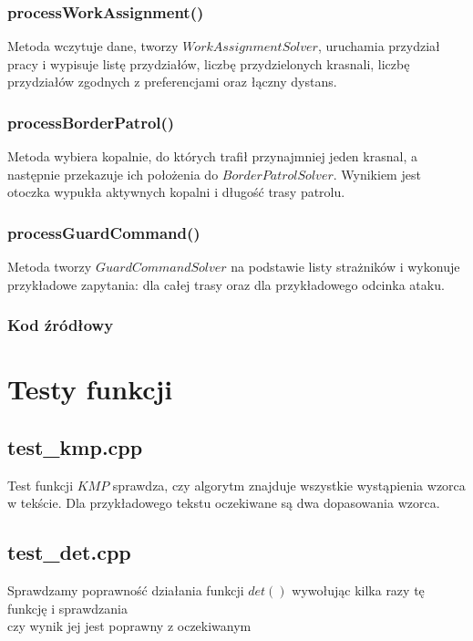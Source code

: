 \documentclass{article}
\begin{document}
\subsubsection{processWorkAssignment()}
Metoda wczytuje dane, tworzy $WorkAssignmentSolver$, uruchamia przydział pracy i wypisuje listę przydziałów, liczbę przydzielonych krasnali, liczbę przydziałów zgodnych z preferencjami oraz łączny dystans.

\subsubsection{processBorderPatrol()}
Metoda wybiera kopalnie, do których trafił przynajmniej jeden krasnal, a następnie przekazuje ich położenia do $BorderPatrolSolver$. Wynikiem jest otoczka wypukła aktywnych kopalni i długość trasy patrolu.

\subsubsection{processGuardCommand()}
Metoda tworzy $GuardCommandSolver$ na podstawie listy strażników i wykonuje przykładowe zapytania: dla całej trasy oraz dla przykładowego odcinka ataku.

\subsubsection{Kod źródłowy}



\section{Testy funkcji}

\subsection{test\_kmp.cpp}
Test funkcji $KMP$ sprawdza, czy algorytm znajduje wszystkie wystąpienia wzorca w tekście. Dla przykładowego tekstu oczekiwane są dwa dopasowania wzorca.


\subsection{test\_det.cpp}
Sprawdzamy poprawność działania funkcji $det()$ wywołując kilka razy tę funkcję i sprawdzania \\ czy wynik jej jest poprawny z oczekiwanym


\end{document}
